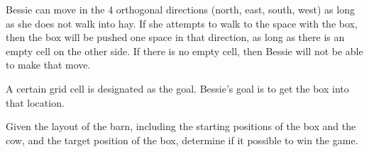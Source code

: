 \documentclass{article}
\begin{document}
\begin{itemize}[leftmargin=0pt]
Bessie can move in the 4 orthogonal directions (north, east, south, west) as long as she does not walk into hay. If she attempts to walk to the space with the box, then the box will be pushed one space in that direction, as long as there is an empty cell on the other side. If there is no empty cell, then Bessie will not be able to make that move.

A certain grid cell is designated as the goal. Bessie's goal is to get the box into that location.

Given the layout of the barn, including the starting positions of the box and the cow, and the target position of the box, determine if it possible to win the game.

\end{itemize}
\end{document}
